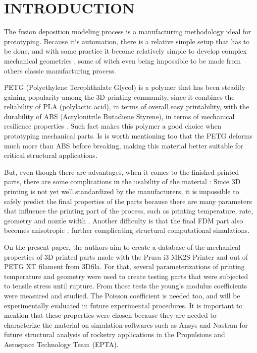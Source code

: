 \documentclass[10pt,fleqn,a4paper,twoside]{article}
\begin{document}
\section{INTRODUCTION}

The fusion deposition modeling process is a manufacturing methodology ideal for prototyping. Because it`s automation, there is a relative simple setup that has to be done, and with some practice it become relatively simple to develop complex mechanical geometries \citep{fdm_today}, some of witch even being impossible to be made from others classic manufacturing process.   

PETG (Polyethylene Terephthalate Glycol) is a polymer that has been steadily gaining popularity among the 3D printing community, since it combines the reliability of PLA (polylactic acid), in terms of overall easy printability, with the durability of ABS (Acrylonitrile Butadiene Styrene), in terms of mechanical resilience properties \citep{tiposfilamento}. Such fact makes this polymer a good choice when prototyping mechanical parts. Is is worth mentioning too that the PETG deforms much more than ABS before breaking, making this material better suitable for critical structural applications. 

But, even though there are advantages, when it comes to the finished printed parts, there are some complications in the usability of the material \citep{3Dcomplication}: Since 3D printing is not yet well standardized by the manufacturers, it is impossible to safely predict the final properties of the parts because there are many parameters that influence the printing part of the process, such as printing temperature, rate, geometry and nozzle width \citep{ABS_PLA_today}. Another difficulty is that the final FDM part also becomes anisotropic \citep{PETG}, further complicating structural computational simulations. 

On the present paper, the authors aim to create a database of the mechanical properties of 3D printed parts made with the Prusa i3 MK2S Printer and out of PETG XT filament from 3Dfila. For that, several parameterizations of printing temperature and geometry were used to create testing parts that were subjected to tensile stress until rupture. From those tests the young's modulus coefficients were measured and studied. The Poisson coefficient is needed too, and will be experimentally evaluated in future experimental procedures. It is important to mention that these properties were chosen because they are needed to characterize the material on simulation softwares such as Ansys and Nastran for future structural analysis of rocketry applications in the Propulsions and Aerospace Technology Team (EPTA).  
\end{document}
